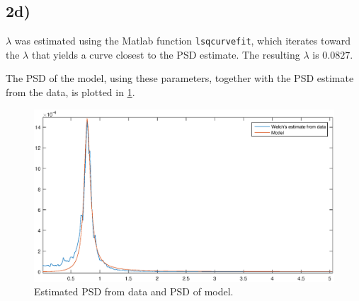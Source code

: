 \subsection{2d)}

$\lambda$ was estimated using the Matlab function \texttt{lsqcurvefit}, which iterates toward the $\lambda$ that yields a curve closest to the PSD estimate. The resulting $\lambda$ is $0.0827$.

The PSD of the model, using these parameters, together with the PSD estimate from the data, is plotted in \cref{fig:PSD}.

\begin{figure}
	\centering
	\includegraphics[width=\textwidth]{images/oppg2/PSD}
	\caption{Estimated PSD from data and PSD of model.}
	\label{fig:PSD}
\end{figure}
